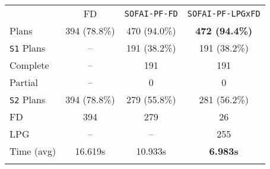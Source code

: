 \documentclass[12pt,a4paper]{standalone}
\begin{document}
	
	
	
	\begin{tabular}{||l|c|c|c||}
	\hhline{~|t:===:t|}
	\multicolumn{1}{c||}{} & \multicolumn{1}{c|}{FD} 	& \texttt{SOFAI-PF-FD}  &\texttt{SOFAI-PF-LPGxFD} \\
	\hhline{|t:=:b:===:|}
	Plans   					& 394 (78.8\%)					&470 (94.0\%) & \textbf{472 (94.4\%)}\\
	\hhline{|:====:|}
	\texttt{S1} Plans   	& --     						&191 (38.2\%) & 191 (38.2\%) \\
	\hhline{||----||}
	\quad Complete			& --      						&191 & 191 \\
	\quad Partial			& --      						&0 & 0\\
	\hhline{|:====:|}
		\texttt{S2} Plans   	& 394 (78.8\%) 						&279 (55.8\%) & 281 (56.2\%) \\
	\hhline{||----||}
	\quad FD			& 394      						&279 & 26 \\
	\quad LPG			& --      						&-- & 255\\
	\hhline{|:====:|}
	Time (avg)  								& 16.619s 						&10.933s & \textbf{6.983s}\\
	\hhline{|b:====:b|}
\end{tabular}
\end{document}
